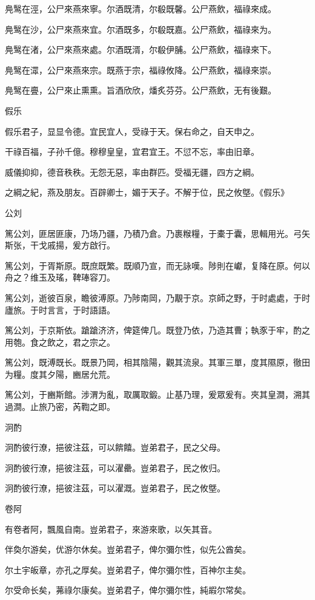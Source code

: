 鳧鹥在涇，公尸來燕來寧。尔酒既清，尔殽既馨。公尸燕飲，福祿來成。

鳧鹥在沙，公尸來燕來宜。尔酒既多，尔殽既嘉。公尸燕飲，福祿來为。

鳧鹥在渚，公尸來燕來處。尔酒既湑，尔殽伊脯。公尸燕飲，福祿來下。

鳧鹥在潀，公尸來燕來宗。既燕于宗，福祿攸降。公尸燕飲，福祿來崇。

鳧鹥在亹，公尸來止熏熏。旨酒欣欣，燔炙芬芬。公尸燕飲，无有後艱。

假乐

假乐君子，显显令德。宜民宜人，受祿于天。保右命之，自天申之。

干祿百福，子孙千億。穆穆皇皇，宜君宜王。不愆不忘，率由旧章。

威儀抑抑，德音秩秩。无怨无惡，率由群匹。受福无疆，四方之綱。

之綱之紀，燕及朋友。百辟卿士，媚于天子。不解于位，民之攸墍。《假乐》

公刘

篤公刘，匪居匪康，乃场乃疆，乃積乃倉。乃裹糇糧，于橐于囊，思輯用光。弓矢斯张，干戈戚揚，爰方啟行。

篤公刘，于胥斯原。既庶既繁。既順乃宣，而无詠嘆。陟則在巘，复降在原。何以舟之？维玉及瑤，鞞琫容刀。

篤公刘，逝彼百泉，瞻彼溥原。乃陟南岡，乃覯于京。京師之野，于时處處，于时廬旅。于时言言，于时語語。

篤公刘，于京斯依。蹌蹌济济，俾筵俾几。既登乃依，乃造其曹；執豕于牢，酌之用匏。食之飲之，君之宗之。

篤公刘，既溥既长。既景乃岡，相其陰陽，觀其流泉。其軍三單，度其隰原，徹田为糧。度其夕陽，豳居允荒。

篤公刘，于豳斯館。涉渭为亂，取厲取鍛。止基乃理，爰眾爰有。夾其皇澗，溯其過澗。止旅乃密，芮鞫之即。

泂酌

泂酌彼行潦，挹彼注茲，可以餴饎。豈弟君子，民之父母。

泂酌彼行潦，挹彼注茲，可以濯罍。豈弟君子，民之攸归。

泂酌彼行潦，挹彼注茲，可以濯溉。豈弟君子，民之攸墍。

卷阿

有卷者阿，飄風自南。豈弟君子，來游來歌，以矢其音。

伴奐尔游矣，优游尔休矣。豈弟君子，俾尔彌尔性，似先公酋矣。

尔土宇皈章，亦孔之厚矣。豈弟君子，俾尔彌尔性，百神尔主矣。

尔受命长矣，茀祿尔康矣。豈弟君子，俾尔彌尔性，純嘏尔常矣。

